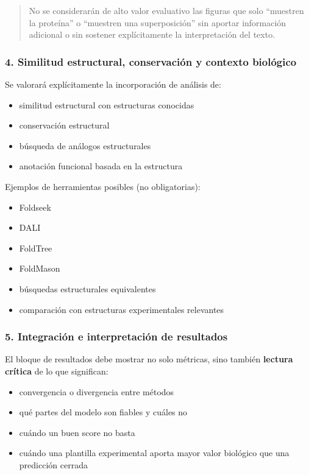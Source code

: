 \documentclass[
  11pt,
  a4paper,
  twoside]{scrreprt}
\begin{document}
\begin{quote}
No se considerarán de alto valor evaluativo las figuras que solo
``muestren la proteína'' o ``muestren una superposición'' sin aportar
información adicional o sin sostener explícitamente la interpretación
del texto.
\end{quote}

\subsubsection{4. Similitud estructural, conservación y contexto
biológico}\label{similitud-estructural-conservaciuxf3n-y-contexto-bioluxf3gico}

Se valorará explícitamente la incorporación de análisis de:

\begin{itemize}
\item
  similitud estructural con estructuras conocidas
\item
  conservación estructural
\item
  búsqueda de análogos estructurales
\item
  anotación funcional basada en la estructura
\end{itemize}

Ejemplos de herramientas posibles (no obligatorias):

\begin{itemize}
\item
  Foldseek
\item
  DALI
\item
  FoldTree
\item
  FoldMason
\item
  búsquedas estructurales equivalentes
\item
  comparación con estructuras experimentales relevantes
\end{itemize}

\subsubsection{5. Integración e interpretación de
resultados}\label{integraciuxf3n-e-interpretaciuxf3n-de-resultados}

El bloque de resultados debe mostrar no solo métricas, sino también
\textbf{lectura crítica} de lo que significan:

\begin{itemize}
\item
  convergencia o divergencia entre métodos
\item
  qué partes del modelo son fiables y cuáles no
\item
  cuándo un buen score no basta
\item
  cuándo una plantilla experimental aporta mayor valor biológico que una
  predicción cerrada
\end{itemize}
\end{document}
